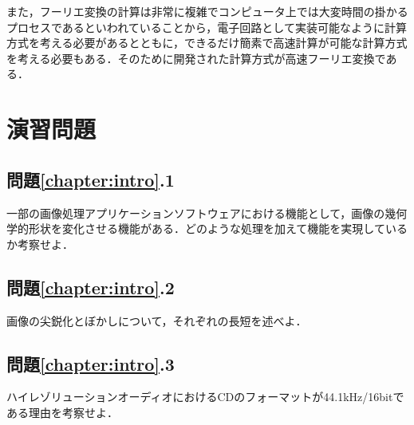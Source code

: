 また，フーリエ変換の計算は非常に複雑でコンピュータ上では大変時間の掛かるプロセスであるといわれていることから，電子回路として実装可能なように計算方式を考える必要があるとともに，できるだけ簡素で高速計算が可能な計算方式を考える必要もある．そのために開発された計算方式が高速フーリエ変換である．


\section*{演習問題}

\subsection*{問題\ref{chapter:intro}.1}

一部の画像処理アプリケーションソフトウェアにおける機能として，画像の幾何学的形状を変化させる機能がある．どのような処理を加えて機能を実現しているか考察せよ．

\subsection*{問題\ref{chapter:intro}.2}

画像の尖鋭化とぼかしについて，それぞれの長短を述べよ．

\subsection*{問題\ref{chapter:intro}.3}

ハイレゾリューションオーディオにおけるCDのフォーマットが44.1kHz/16bitである理由を考察せよ．

